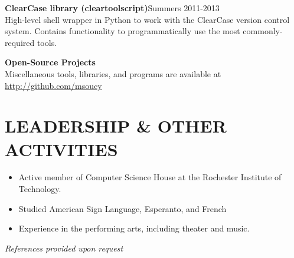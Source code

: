 \documentclass[line]{res}
\newcommand{\project}[2][]{{\bf #2}\hfill #1\\}
\begin{document}
\begin{resume}
	\project[Summers 2011-2013]      {ClearCase library (cleartoolscript)}
	High-level shell wrapper in Python to work with the ClearCase version control system.
	Contains functionality to programmatically use the most commonly-required tools.

	\project                         {Open-Source Projects}
	Miscellaneous tools, libraries, and programs are available at \url{http://github.com/msoucy}

\section{LEADERSHIP \& OTHER ACTIVITIES}
	\begin{itemize}
		\item Active member of Computer Science House at the Rochester Institute of Technology.
		\item Studied American Sign Language, Esperanto, and French
		\item Experience in the performing arts, including theater and music.
	\end{itemize}

\begin{center}\vspace{-0.25in}\emph{References provided upon request\\[8pt]}\end{center}

\end{resume}
\end{document}
